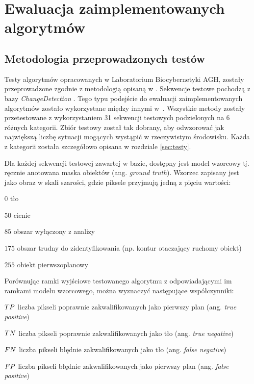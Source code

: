\chapter{Ewaluacja zaimplementowanych algorytmów}
\label{cha:ewaluacja}

\section{Metodologia przeprowadzonych testów}
\label{sec:metodologia_testow}

Testy algorytmów opracowanych w Laboratorium Biocybernetyki AGH, zostały przeprowadzone zgodnie z metodologią opisaną w \cite{changedetection_15}. Sekwencje testowe pochodzą z bazy \textit{ChangeDetection} \cite{change_detection_web}. Tego typu podejście do ewaluacji zaimplementowanych algorytmów zostało wykorzystane między innymi w~\cite{kryjak_14_vibe, kryjak_14_pbas, janus_15}. Wszystkie metody zostały przetestowane z wykorzystaniem 31 sekwencji testowych podzielonych na 6 różnych kategorii. Zbiór testowy został tak dobrany, aby odwzorować jak największą liczbę sytuacji mogących wystąpić w rzeczywistym środowisku. Każda z kategorii została szczegółowo opisana w rozdziale \ref{sec:testy}.

Dla każdej sekwencji testowej zawartej w bazie, dostępny jest model wzorcowy tj. ręcznie anotowana maska obiektów (ang. \textit{ground truth}). Wzorzec zapisany jest jako obraz w skali szarości, gdzie piksele przyjmują jedną z pięciu wartości:

\begin{eqwhere}[2cm]
	\item[$0$] tło
	\item[$50$] cienie
	\item[$85$] obszar wyłączony z analizy
	\item [$175$] obszar trudny do zidentyfikowania (np. kontur otaczający ruchomy obiekt)
	\item [$255$] obiekt pierwszoplanowy \\
\end{eqwhere}  

\noindent Porównując ramki wyjściowe testowanego algorytmu z odpowiadającymi im ramkami modelu wzorcowego, można wyznaczyć następujące współczynniki:
\begin{eqwhere}[2cm]
	\item[$\small TP$] liczba pikseli poprawnie zakwalifikowanych jako pierwszy plan (ang. \textit{true positive})
	\item[$\small TN$] liczba pikseli poprawnie zakwalifikowanych jako tło (ang. \textit{true negative})
	\item[$\small FN$] liczba pikseli błędnie zakwalifikowanych jako tło (ang. \textit{false negative})
	\item[$\small FP$] liczba pikseli błędnie zakwalifikowanych jako pierwszy plan (ang. \textit{false positive})\\
\end{eqwhere}

